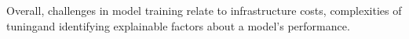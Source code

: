 \DIFdelbegin %

\DIFdelend Overall, challenges in model training relate to infrastructure costs, complexities of tuning\DIFaddbegin \DIFadd{, }\DIFaddend and identifying explainable factors about a model's performance.

